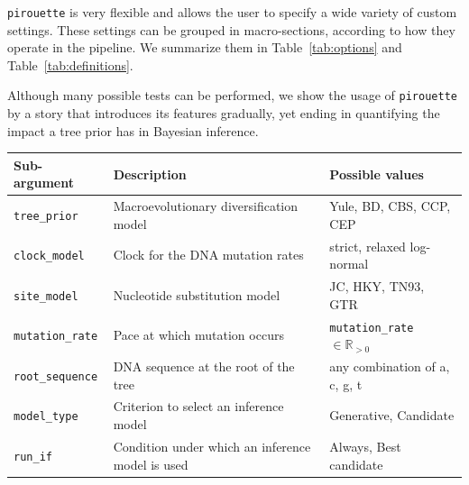 \verb;pirouette; is very flexible and allows the user 
to specify a wide variety of custom settings. 
These settings can be grouped in macro-sections, 
according to how they operate in the pipeline. 
We summarize them in Table~\ref{tab:options} and Table~\ref{tab:definitions}.

Although many possible tests can be performed, 
we show the usage of \verb;pirouette; by a story that introduces
its features gradually, yet ending in quantifying the impact a tree prior has
in Bayesian inference.

\begin{table}
\centering
  \begin{tabular}{|p{3.4cm}|p{9.7cm}|p{4.5cm}@{}|}
    \hline
    \centering
    \textbf{Sub-argument} & 
    \textbf{Description} &
    \textbf{Possible values} \\ 
    \hline
    \verb;tree_prior; &
    Macroevolutionary diversification model &
    Yule, BD, CBS, CCP, CEP \\
    \verb;clock_model; &
    Clock for the DNA mutation rates &
    strict, relaxed log-normal \\
    \verb;site_model; &
    Nucleotide substitution model &
    JC, HKY, TN93, GTR \\
    \verb;mutation_rate; &
    Pace at which mutation occurs &
    \verb;mutation_rate; $\in \mathbb{R}_{>0}$\\
    \verb;root_sequence; &
    DNA sequence at the root of the tree &
    any combination of a, c, g, t \\
    \verb;model_type; &
    Criterion to select an inference model &
    Generative, Candidate \\
    \verb;run_if; &
    Condition under which an inference model is used &
    Always, Best candidate \\

\end{tabular}
\end{table}
